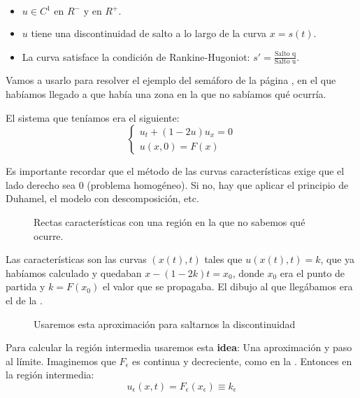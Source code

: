 			\begin{itemize}[itemsep = 1pt]
				\item $ u \in C^1 \text{ en } R^{-} \text{ y en } R^{+}. $
				\item $u$ tiene una discontinuidad de salto a lo largo de la curva $x = s(t)$.
				\item La curva satisface la condición de Rankine-Hugoniot: $s' = \frac{\text{Salto q}}{\text{Salto u}}$.
			\end{itemize}

			Vamos a usarlo para resolver el ejemplo del semáforo de la página \pageref{ejm:Semaforo}, en el que habíamos llegado a que había una zona en la que no sabíamos qué ocurría.

			\begin{example}
				El sistema que teníamos era el siguiente:
				\[
				\begin{cases} u_t + (1-2u)u_x = 0 \\
				u(x,0) = F(x)
				\end{cases} \]

				\obs Es importante recordar que el método de las curvas características exige que el lado derecho sea 0 (problema homogéneo). Si no, hay que aplicar el principio de Duhamel, el modelo con descomposición, etc.

				\begin{figure}[hbtp]
					\centering
					\caption{Rectas características con una región en la que no sabemos qué ocurre.}
					\label{fig:caracteristicasSemaforo2}
				\end{figure}

				Las características son las curvas $(x(t),t)$ tales que $u(x(t),t) = k$, que ya habíamos calculado y quedaban $x - (1-2k)t = x_0$, donde $x_0$ era el punto de partida y $k = F(x_0)$ el valor que se propagaba. El dibujo al que llegábamos era el de la .

				\begin{wrapfigure}{L}{0.3\textwidth}
					\centering
					\caption{Usaremos esta aproximación para saltarnos la discontinuidad}
					\label{fig:FEpsilon}
				\end{wrapfigure}

				Para calcular la región intermedia usaremos esta \textbf{idea}: Una aproximación y paso al límite. Imaginemos que $F_\epsilon$ es continua y decreciente, como en la . Entonces en la región intermedia:
				\[ u_\epsilon (x,t) = F_\epsilon (x_\epsilon) \equiv k_\epsilon \]


\end{example}
